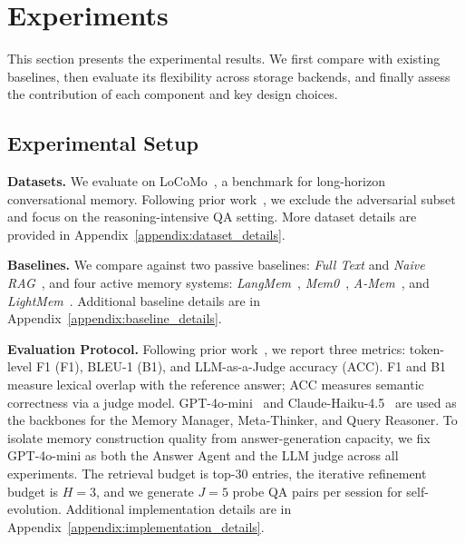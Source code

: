 \section{Experiments}
This section presents the experimental results.
We first compare \method with existing baselines, then evaluate 
its flexibility across storage backends, and finally assess 
the contribution of each component and key design choices.

\subsection{Experimental Setup}
\label{ssec:experimental_setup}
\noindent\textbf{Datasets.} 
We evaluate \method on LoCoMo~\cite{maharana2024evaluating}, a benchmark for long-horizon conversational memory.
Following prior work~\cite{yan2025memory,fang2025lightmem}, we exclude the adversarial subset and focus on the reasoning-intensive QA setting.
More dataset details are provided in Appendix~\ref{appendix:dataset_details}.

\noindent\textbf{Baselines.} 
We compare against two passive baselines: \emph{Full Text} and 
\emph{Naive RAG}~\cite{gao2023retrieval}, and four active memory systems: 
\emph{LangMem}~\cite{LangMemBlog}, 
\emph{Mem0}~\cite{chhikara2025mem0}, 
\emph{A-Mem}~\cite{xu2025mem}, and 
\emph{LightMem}~\cite{fang2025lightmem}.
Additional baseline details are in Appendix~\ref{appendix:baseline_details}.

\noindent\textbf{Evaluation Protocol.} Following prior work~\cite{yan2025memory,chhikara2025mem0}, we report three metrics: token-level F1 (F1), BLEU-1 (B1), and LLM-as-a-Judge accuracy (ACC).
F1 and B1 measure lexical overlap with the reference answer; 
ACC measures semantic correctness via a judge model.
GPT-4o-mini~\cite{gpt4ocard} and Claude-Haiku-4.5~\cite{anthropic2025claudehaiku45} are used as the backbones for the Memory Manager, Meta-Thinker, and Query Reasoner.
To isolate memory construction quality from answer-generation capacity, we fix GPT-4o-mini as both the Answer Agent and the LLM judge across all experiments.
The retrieval budget is top-$30$ entries, the iterative refinement budget is $H{=}3$, and we generate $J{=}5$ probe QA pairs per session for self-evolution.
Additional implementation details are in Appendix~\ref{appendix:implementation_details}.


